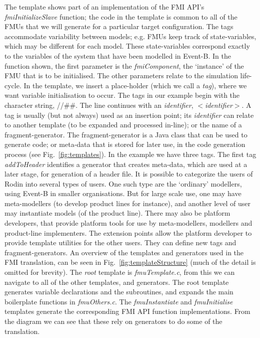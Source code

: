 \documentclass{llncs}%
\begin{document}
%
%
The template shows part of an implementation of the FMI API's \emph{fmiInitializeSlave} function; the code in the template is common to all of the FMUs that we will generate for a particular target configuration. The tags accommodate variability between models; e.g. FMUs keep track of state-variables, which may be different for each model. These state-variables correspond exactly to the variables of the system that have been modelled in Event-B. In the function shown, the first parameter is the \emph{fmiComponent}, the `instance' of the FMU that is to be initialised. The other parameters relate to the simulation life-cycle.  
In the template, we insert a place-holder (which we call a \emph{tag}), where we want variable initialisation to occur. The tags in our example begin with the character string, //\#\#.  The line continues with an \emph{identifier}, $<$\emph{identifier}$>$. A tag is usually (but not always) used as an insertion point; its \emph{identifier} can relate to another template (to be expanded and processed in-line); or the name of a fragment-generator. The fragment-generator is a Java class that can be used to generate code; or meta-data that is stored for later use, in the code generation process  (see Fig.~\ref{fig:templates}). In the example we have three tags. The first tag \emph{addToHeader} identifies a generator that creates meta-data, which are used at a later stage, for generation of a header file. It is possible to categorize the users of Rodin into several types of users. One such type are the `ordinary' modellers, using Event-B in smaller organisations. But for large scale use, one may have meta-modellers (to develop product lines for instance), and another level of user may instantiate models (of the product line). There may also be platform developers, that provide platform tools for use by meta-modellers, modellers and product-line implementers. The extension points allow the platform developer to provide template utilities for the other users. They can define new tags and fragment-generators.
An overview of the  templates and generators used in the FMI translation, can be seen in Fig.~\ref{fig:templateStructure} (much of the detail is omitted for brevity). The \emph{root} template is \emph{fmuTemplate.c}, from this we can navigate to all of the other templates, and generators. The root template generates variable declarations and the subroutines, and expands the main boilerplate functions in \emph{fmuOthers.c}. The \emph{fmuInstantiate} and \emph{fmuInitialise} templates generate the corresponding FMI API function implementations. From the diagram we can see that these rely on generators to do some of the translation.
\end{document}

